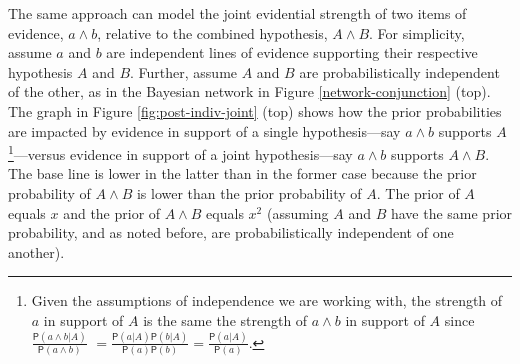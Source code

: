 \documentclass[
  10pt,
  dvipsnames,enabledeprecatedfontcommands]{scrartcl}
\newcommand{\pr}[1]{\mathsf{P}(#1)}
\begin{document}
The same approach can model the joint evidential strength of two items
of evidence, \(a \wedge b\), relative to the combined hypothesis,
\(A \wedge B\). For simplicity, assume \(a\) and \(b\) are independent
lines of evidence supporting their respective hypothesis \(A\) and
\(B\). Further, assume \(A\) and \(B\) are probabilistically independent
of the other, as in the Bayesian network in Figure
\ref{network-conjunction} (top). The graph in Figure
\ref{fig:post-indiv-joint} (top) shows how the prior probabilities are
impacted by evidence in support of a single hypothesis---say
\(a\wedge b\) supports
\(A\)\footnote{Given the assumptions of independence we are working with, the strength of $a$ in support of $A$ is the same the strength of 
$a\wedge b$ in support of $A$ since $\frac{\pr{a\wedge b \vert A}}{\pr{a \wedge b}}$ $=\frac{\pr{a \vert A}\pr{b \vert A}}{\pr{a}\pr{b}}=\frac{\pr{a \vert A}}{\pr{a}}$.}---versus
evidence in support of a joint hypothesis---say \(a\wedge b\) supports
\(A \wedge B\). The base line is lower in the latter than in the former
case because the prior probability of \(A \wedge B\) is lower than the
prior probability of \(A\). The prior of \(A\) equals \(x\) and the
prior of \(A\wedge B\) equals \(x^2\) (assuming \(A\) and \(B\) have the
same prior probability, and as noted before, are probabilistically
independent of one another).
\end{document}
